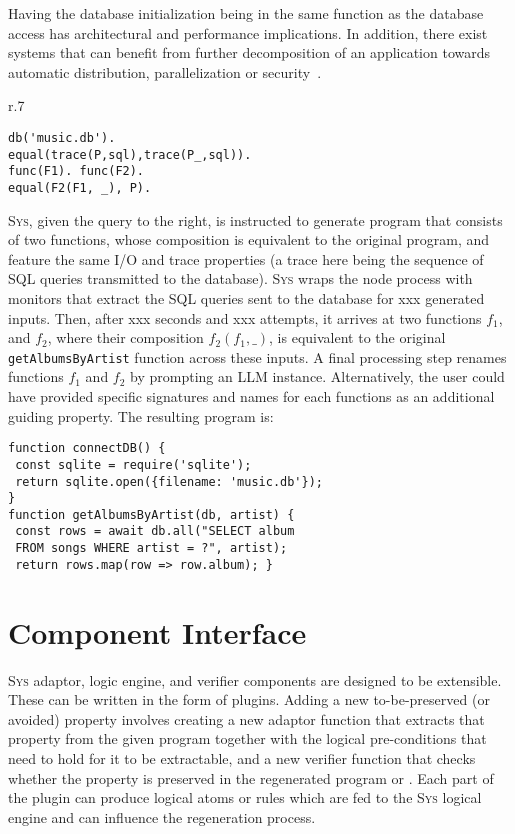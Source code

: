 \documentclass[sigplan]{acmart}
\newcommand{\sys}{{\scshape Sys}\xspace}
\newcommand{\heading}[1]{\vspace{2pt}\noindent\textbf{\emph{#1}}:\enspace}
\newcommand{\ttt}[1]{\texttt{#1}}
\newcommand{\xxx}{\colorbox{red!30}{xxx}\xspace}
\begin{document}
Having the database initialization being in the same function as 
the database access has architectural and performance implications.
In addition, there exist systems that can benefit from further decomposition
of an application towards automatic distribution, parallelization or security~\cite{Towards_Modern_Ghemaw_2023, vasilakis2019ignis, vasilakis2018breakapp}.
\begin{wrapfigure}[6]{r}{.7\columnwidth}
  \vspace{-10pt}
  \begin{verbatim}
db('music.db').
equal(trace(P,sql),trace(P_,sql)).
func(F1). func(F2).
equal(F2(F1, _), P).
\end{verbatim}
\end{wrapfigure}
\sys, given the query to the right, is instructed 
to generate program that consists of two functions,
whose composition is equivalent to the original program, and feature 
the same I/O and trace properties (a trace here being the sequence of SQL 
queries transmitted to the database).
\sys wraps the node process with monitors that extract the SQL queries 
sent to the database for \xxx generated inputs.
Then, after \xxx seconds and \xxx attempts, it arrives at two functions $f_1$, and 
$f_2$, where their composition $f_2(f_1, \_)$, is equivalent to the original \ttt{getAlbumsByArtist} function across these inputs.
A final processing step renames functions $f_1$ and $f_2$ by prompting an LLM instance.
Alternatively, the user could have provided specific signatures and names for each 
functions as an additional guiding property.
The resulting program is:
\begin{verbatim}
function connectDB() {
 const sqlite = require('sqlite');
 return sqlite.open({filename: 'music.db'}); 
}
function getAlbumsByArtist(db, artist) {
 const rows = await db.all("SELECT album
 FROM songs WHERE artist = ?", artist);
 return rows.map(row => row.album); }
\end{verbatim}


\section{Component Interface}

\sys adaptor, logic engine, and verifier components
are designed to be extensible.
These can be written in the form of plugins.
Adding a new to-be-preserved (or avoided) property involves 
creating a new adaptor function that extracts that property from the given 
program together with the logical pre-conditions that need to hold 
for it to be extractable, and a new verifier function that checks whether the
property is preserved in the regenerated program or .
Each part of the plugin can produce logical atoms or rules which are fed to the \sys 
logical engine and can influence the regeneration process.
\end{document}
